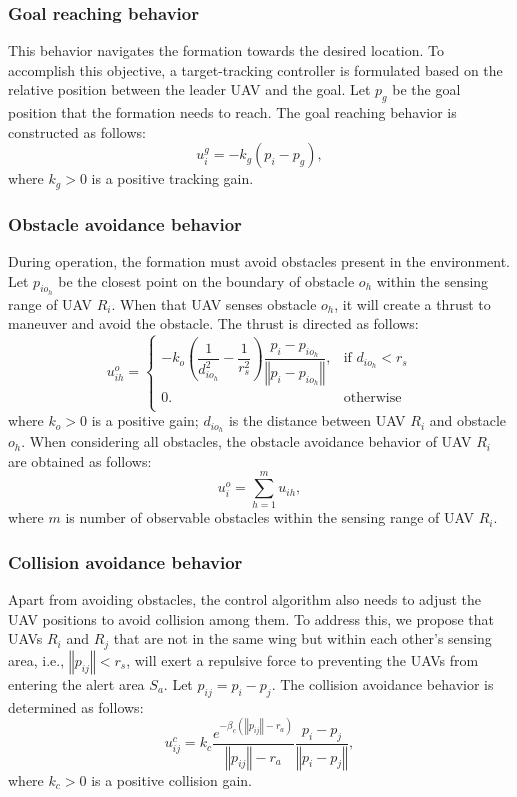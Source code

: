 \subsubsection{Goal reaching behavior}
This behavior navigates the formation towards the desired location. To accomplish this objective, a target-tracking controller is formulated based on the relative position between the leader UAV and the goal. Let $p_g$ be the goal position that the formation needs to reach. The goal reaching behavior is constructed as follows: 
\begin{equation}
    u_i^g=-k_g\left(p_i - p_g\right),
    \label{eqn:chap2_ug}
\end{equation}
where $k_g>0$ is a positive tracking gain.

\subsubsection{Obstacle avoidance behavior}
During operation, the formation must avoid obstacles present in the environment. Let $p_{io_h}$ be the closest point on the boundary of obstacle $o_h$ within the sensing range of UAV $R_i$. When that UAV senses obstacle $o_h$, it will create a thrust to maneuver and avoid the obstacle. The thrust is directed as follows:
\begin{equation}
    u_{ih}^{o}=\left\{ \begin{array}{cc}
-k_o\left(\dfrac{1}{d_{io_h}^2} - \dfrac{1}{r_s^2}\right)\dfrac{p_i-p_{io_h}}{\left\Vert p_i-p_{io_h}\right\Vert}, & \text{if } d_{io_h} < r_s\\
0. & \text{otherwise}\\
\end{array}\right.
\end{equation}
where $k_o>0$ is a positive gain; $d_{io_h}$ is the distance between UAV $R_i$ and obstacle $o_h$. When considering all obstacles, the obstacle avoidance behavior of UAV $R_i$ are obtained as follows:
\begin{equation}
    u_i^o=\sum_{h=1}^m{u_{ih}},
    \label{eqn:chap2_uo}
\end{equation}
where $m$ is number of observable obstacles within the sensing range of UAV $R_i$.

\subsubsection{Collision avoidance behavior}
Apart from avoiding obstacles, the control algorithm also needs to adjust the UAV positions to avoid collision among them. To address this, we propose that UAVs $R_i$ and $R_j$ that are not in the same wing but within each other's sensing area, i.e., $\left\Vert p_{ij}\right\Vert < r_{s}$, will exert a repulsive force to preventing the UAVs from entering the alert area $S_a$. Let $p_{ij}=p_i-p_j$. The collision avoidance behavior is determined as follows:
\begin{equation}
    u_{ij}^{c}=k_{c}\dfrac{e^{-\beta_{c}\left(\left\Vert p_{ij}\right\Vert -r_{a}\right)}}{\left\Vert p_{ij}\right\Vert -r_{a}}\dfrac{p_i-p_j}{\left\Vert p_i-p_j\right\Vert},
    \label{eqn:chap2_uc}
\end{equation}
where $k_c>0$ is a positive collision gain.

